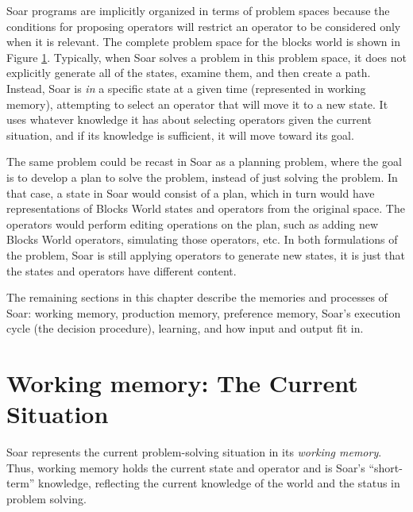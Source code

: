 Soar programs are implicitly organized in terms of problem spaces
because the conditions for proposing operators will restrict an operator
to be considered only when it is relevant.  The complete problem space
for the blocks world is shown in Figure \ref{fig:blocks-ps}.  Typically,
when Soar solves a problem in this problem space, it does not explicitly
generate all of the states, examine them, and then create a path.
Instead, Soar is \emph{in} a specific state at a given time (represented
in working memory), attempting to select an operator that will move it
to a new state.  It uses whatever knowledge it has about selecting
operators given the current situation, and if its knowledge is
sufficient, it will move toward its goal.
\begin{figure}
\label{fig:blocks-ps}
\end{figure}
The same problem could be recast in Soar as a planning problem, where
the goal is to develop a plan to solve the problem, instead of just
solving the problem.  In that case, a state in Soar would consist of a
plan, which in turn would have representations of Blocks World states
and operators from the original space.  The operators would perform
editing operations on the plan, such as adding new Blocks World
operators, simulating those operators, etc.  In both formulations of the
problem, Soar is still applying operators to generate new states, it is
just that the states and operators have different content.

The remaining sections in this chapter describe the memories and processes of Soar:
working memory, production memory, preference memory, Soar's execution cycle (the decision
procedure), learning, and how  input and output fit in.
\section{Working memory: The Current Situation} 
\label{ARCH-wm}

Soar represents the current problem-solving situation in its \emph{working
memory}. Thus, working memory holds the current state and operator and is Soar's
``short-term'' knowledge, reflecting the current knowledge of the world and
the status in problem solving.

